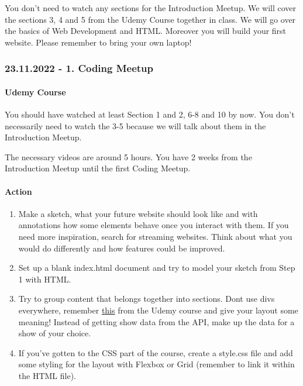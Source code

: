 \documentclass[
]{article}
\providecommand{\tightlist}{%
  \setlength{\itemsep}{0pt}\setlength{\parskip}{0pt}}
\begin{document}
You don't need to watch any sections for the Introduction Meetup. We will cover the sections 3, 4 and 5 from the Udemy Course together in class. We will go over the basics of Web Development and HTML. Moreover you will build your first website. Please remember to bring your own laptop!

\hypertarget{coding-meetup}{%
\subsubsection*{23.11.2022 - 1. Coding Meetup}\label{coding-meetup}}

\hypertarget{udemy-course-1}{%
\paragraph*{Udemy Course}\label{udemy-course-1}}

You should have watched at least Section 1 and 2, 6-8 and 10 by now. You don't necessarily need to watch the 3-5 because we will talk about them in the Introduction Meetup.

The necessary videos are around 5 hours. You have 2 weeks from the Introduction Meetup until the first Coding Meetup.

\hypertarget{action}{%
\paragraph*{Action}\label{action}}

\begin{enumerate}
\def\labelenumi{\arabic{enumi}.}
\tightlist
\item
  Make a sketch, what your future website should look like and with annotations how some elements behave once you interact with them. If you need more inspiration, search for streaming websites. Think about what you would do differently and how features could be improved.
\item
  Set up a blank index.html document and try to model your sketch from Step 1 with HTML.
\item
  Try to group content that belongs together into sections. Dont use divs everywhere, remember \href{https://www.udemy.com/course/the-web-developer-bootcamp/learn/lecture/21919368\#overview}{this} from the Udemy course and give your layout some meaning! Instead of getting show data from the API, make up the data for a show of your choice.
\item
  If you've gotten to the CSS part of the course, create a style.css file and add some styling for the layout with Flexbox or Grid (remember to link it within the HTML file).
\end{enumerate}
\end{document}
